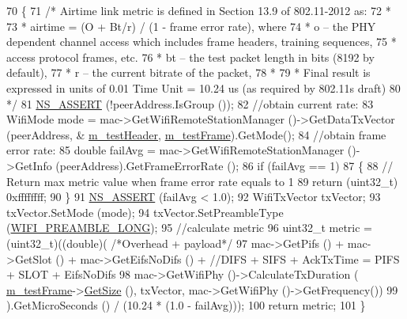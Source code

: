 \begin{DoxyCode}
70 \{
71   \textcolor{comment}{/* Airtime link metric is defined in Section 13.9 of 802.11-2012 as:}
72 \textcolor{comment}{   *}
73 \textcolor{comment}{   * airtime = (O + Bt/r) /  (1 - frame error rate), where}
74 \textcolor{comment}{   * o  -- the PHY dependent channel access which includes frame headers, training sequences,}
75 \textcolor{comment}{   *       access protocol frames, etc.}
76 \textcolor{comment}{   * bt -- the test packet length in bits (8192 by default),}
77 \textcolor{comment}{   * r  -- the current bitrate of the packet,}
78 \textcolor{comment}{   *}
79 \textcolor{comment}{   * Final result is expressed in units of 0.01 Time Unit = 10.24 us (as required by 802.11s draft)}
80 \textcolor{comment}{   */}
81   \hyperlink{assert_8h_a6dccdb0de9b252f60088ce281c49d052}{NS\_ASSERT} (!peerAddress.IsGroup ());
82   \textcolor{comment}{//obtain current rate:}
83   WifiMode mode = mac->GetWifiRemoteStationManager ()->GetDataTxVector (peerAddress, &
      \hyperlink{classns3_1_1dot11s_1_1AirtimeLinkMetricCalculator_ab0ae80f5adbf2dedd3346a934baf5943}{m\_testHeader}, \hyperlink{classns3_1_1dot11s_1_1AirtimeLinkMetricCalculator_a28cc4e99da4ac3b38604bc512903b677}{m\_testFrame}).GetMode();
84   \textcolor{comment}{//obtain frame error rate:}
85   \textcolor{keywordtype}{double} failAvg = mac->GetWifiRemoteStationManager ()->GetInfo (peerAddress).GetFrameErrorRate ();
86   \textcolor{keywordflow}{if} (failAvg == 1)
87     \{
88       \textcolor{comment}{// Return max metric value when frame error rate equals to 1}
89       \textcolor{keywordflow}{return} (uint32\_t) 0xffffffff;
90     \}
91   \hyperlink{assert_8h_a6dccdb0de9b252f60088ce281c49d052}{NS\_ASSERT} (failAvg < 1.0);
92   WifiTxVector txVector;
93   txVector.SetMode (mode);
94   txVector.SetPreambleType (\hyperlink{group__wifi_gga5e94a56cb338a14ffbbb19c6a41251eba12f3d9468d1630bd38bbef20df1e3eda}{WIFI\_PREAMBLE\_LONG});
95   \textcolor{comment}{//calculate metric}
96   uint32\_t metric = (uint32\_t)((\textcolor{keywordtype}{double})( \textcolor{comment}{/*Overhead + payload*/}
97                                  mac->GetPifs () + mac->GetSlot () + mac->GetEifsNoDifs () + \textcolor{comment}{//DIFS + SIFS
       + AckTxTime = PIFS + SLOT + EifsNoDifs}
98                                  mac->GetWifiPhy ()->CalculateTxDuration (
      \hyperlink{classns3_1_1dot11s_1_1AirtimeLinkMetricCalculator_a28cc4e99da4ac3b38604bc512903b677}{m\_testFrame}->\hyperlink{classns3_1_1Packet_a462855c9929954d4301a4edfe55f4f1c}{GetSize} (), txVector, mac->GetWifiPhy ()->GetFrequency())
99                                  ).GetMicroSeconds () / (10.24 * (1.0 - failAvg)));
100   \textcolor{keywordflow}{return} metric;
101 \}
\end{DoxyCode}


